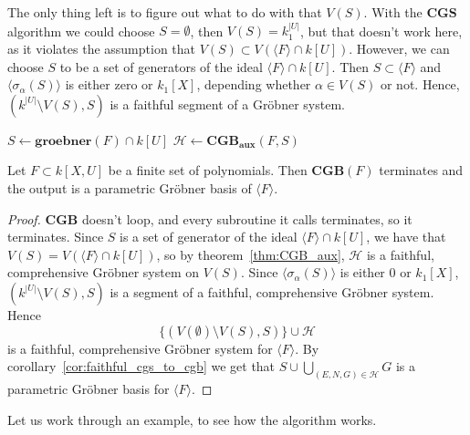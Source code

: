 The only thing left is to figure out what to do with that $V(S)$. With the $\mathbf{CGS}$ algorithm we could choose $S = \emptyset$, then $V(S) = k_{1}^{|U|}$, but that doesn't work here, as it violates the assumption that $V(S) \subset V(\langle F \rangle \cap k[U])$. However, we can choose $S$ to be a set of generators of the ideal $\langle F \rangle \cap k[U]$. Then $S \subset \langle F \rangle$ and $\langle \sigma_{\alpha}(S) \rangle$ is either zero or $k_{1}[X]$, depending whether $\alpha \in V(S)$ or not. Hence, $(k^{|U|} \setminus V(S), S)$ is a faithful segment of a Gröbner system.

\begin{algorithm}
  \caption{$\mathbf{CGB}$}
  $S \gets \mathbf{groebner}(F) \cap k[U]$\;
  $\mathcal H \gets \mathbf{CGB_{aux}}(F, S)$\;
  \;
\end{algorithm}
\begin{theorem}
  Let $F \subset k[X, U]$ be a finite set of polynomials. Then $\mathbf{CGB}(F)$ terminates and the output is a parametric Gröbner basis of $\langle F \rangle$.
\end{theorem}
\begin{proof}
  $\mathbf{CGB}$ doesn't loop, and every subroutine it calls terminates, so it terminates. Since $S$ is a set of generator of the ideal $\langle F \rangle \cap k[U]$, we have that $V(S) = V(\langle F \rangle \cap k[U])$, so by theorem~\ref{thm:CGB_aux}, $\mathcal H$ is a faithful, comprehensive Gröbner system on $V(S)$. Since $\langle \sigma_{\alpha}(S) \rangle$ is either 0 or $k_{1}[X]$, $(k^{|U|} \setminus V(S), S)$ is a segment of a faithful, comprehensive Gröbner system. Hence \[\{(V(\emptyset) \setminus V(S), S)\} \cup \mathcal H\] is a faithful, comprehensive Gröbner system for $\langle F \rangle$. By corollary~\ref{cor:faithful_cgs_to_cgb} we get that $S \cup \bigcup_{(E, N, G) \in \mathcal H} G$ is a parametric Gröbner basis for $\langle F \rangle$.
\end{proof}

Let us work through an example, to see how the algorithm works.

